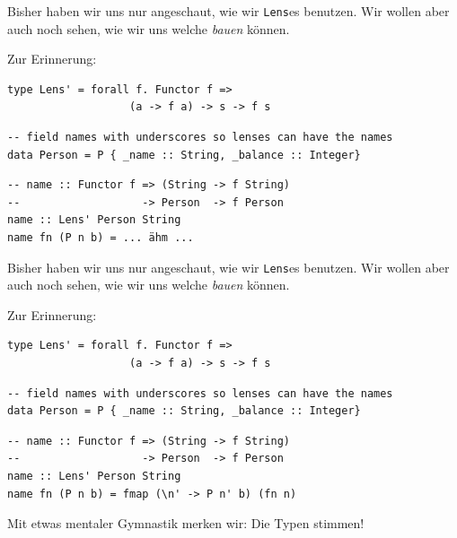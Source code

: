 \documentclass{beamer}
\begin{document}

\begin{frame}[fragile]

Bisher haben wir uns nur angeschaut, wie wir \texttt{Lens}es benutzen. Wir wollen aber auch noch sehen, wie wir uns welche \emph{bauen} können.
\smallskip
\smallskip

Zur Erinnerung:
\begin{verbatim}
type Lens' = forall f. Functor f =>
                   (a -> f a) -> s -> f s
\end{verbatim}
\smallskip

\begin{verbatim}
-- field names with underscores so lenses can have the names
data Person = P { _name :: String, _balance :: Integer}
\end{verbatim}
\bigskip

\begin{verbatim}
-- name :: Functor f => (String -> f String)
--                   -> Person  -> f Person
name :: Lens' Person String
name fn (P n b) = ... ähm ...
\end{verbatim}

\end{frame}


\begin{frame}[fragile]

Bisher haben wir uns nur angeschaut, wie wir \texttt{Lens}es benutzen. Wir wollen aber auch noch sehen, wie wir uns welche \emph{bauen} können.
\smallskip
\smallskip

Zur Erinnerung:
\begin{verbatim}
type Lens' = forall f. Functor f =>
                   (a -> f a) -> s -> f s
\end{verbatim}
\smallskip

\begin{verbatim}
-- field names with underscores so lenses can have the names
data Person = P { _name :: String, _balance :: Integer}
\end{verbatim}
\bigskip

\begin{verbatim}
-- name :: Functor f => (String -> f String)
--                   -> Person  -> f Person
name :: Lens' Person String
name fn (P n b) = fmap (\n' -> P n' b) (fn n)
\end{verbatim}
\pause

Mit etwas mentaler Gymnastik merken wir: Die Typen stimmen!

\end{frame}
\end{document}
